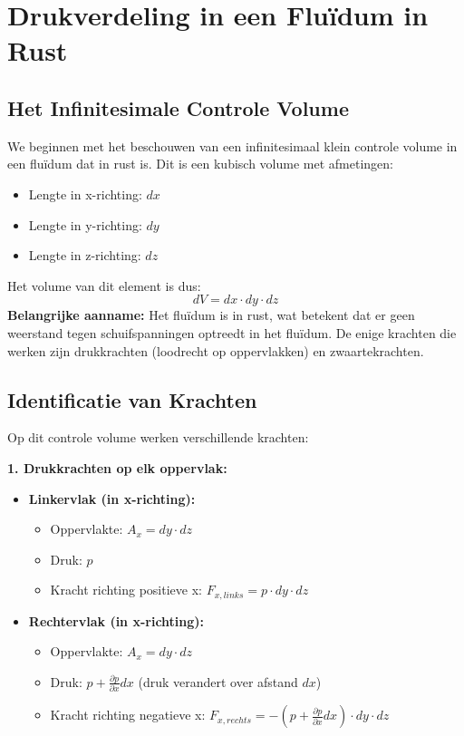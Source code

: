 \documentclass[a4paper,11pt,twoside]{report}
\begin{document}
\section{Drukverdeling in een Fluïdum in Rust}
\subsection{Het Infinitesimale Controle Volume}
We beginnen met het beschouwen van een infinitesimaal klein controle volume in een fluïdum dat in rust is. Dit is een kubisch volume met afmetingen:
\begin{itemize}
    \item Lengte in x-richting: $dx$
    \item Lengte in y-richting: $dy$
    \item Lengte in z-richting: $dz$
\end{itemize}
Het volume van dit element is dus:
\[
dV = dx \cdot dy \cdot dz
\]
\textbf{Belangrijke aanname:} Het fluïdum is in rust, wat betekent dat er geen weerstand tegen schuifspanningen optreedt in het fluïdum. De enige krachten die werken zijn drukkrachten (loodrecht op oppervlakken) en zwaartekrachten.

\subsection{Identificatie van Krachten}
Op dit controle volume werken verschillende krachten:

\textbf{1. Drukkrachten op elk oppervlak:}
\begin{itemize}
    \item \textbf{Linkervlak (in x-richting):}
    \begin{itemize}
        \item Oppervlakte: $A_x = dy \cdot dz$
        \item Druk: $p$
        \item Kracht richting positieve x: $F_{x,links} = p \cdot dy \cdot dz$
    \end{itemize}
    \item \textbf{Rechtervlak (in x-richting):}
    \begin{itemize}
        \item Oppervlakte: $A_x = dy \cdot dz$
        \item Druk: $p + \frac{\partial p}{\partial x} dx$ (druk verandert over afstand $dx$)
        \item Kracht richting negatieve x: $F_{x,rechts} = -\left(p + \frac{\partial p}{\partial x} dx\right) \cdot dy \cdot dz$
    \end{itemize}
\end{itemize}
\end{document}
